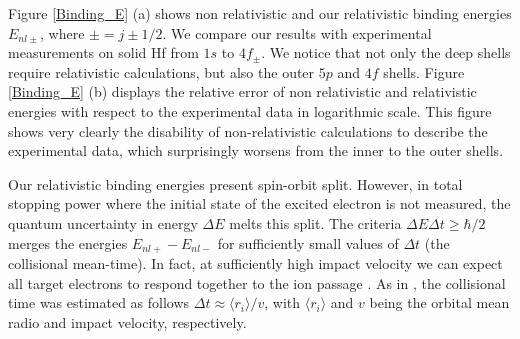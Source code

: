 \documentclass[aps,prb,reprint,groupedaddress]{revtex4-1}
\begin{document}
Figure \ref{Binding_E} (a) shows non relativistic and our relativistic binding energies $E_{nl\pm}$, where $\pm=j\pm1/2$.
We compare our results with experimental measurements on solid Hf \cite{williams1995} from $1s$ to $4f_{\pm}$. We notice that not only the deep shells require relativistic calculations, but also the outer $5p$ and $4f$ shells. Figure \ref{Binding_E} (b) displays the relative error of non relativistic and relativistic energies with respect to the experimental data in logarithmic scale. This figure shows very clearly the disability of non-relativistic calculations to describe the experimental data, which surprisingly worsens from the inner to the outer shells. 


Our relativistic binding energies present spin-orbit split. However, in total stopping power where the initial state of the excited electron is not measured, the quantum uncertainty in energy $\Delta E$ melts this split. The criteria $\Delta E\Delta t \geq \hbar /2$ merges the energies  $E_{nl+} - E_{nl-}$ for sufficiently small values of $\Delta t$ (the collisional mean-time). In fact, at sufficiently high impact velocity we can expect all target electrons to respond together to the ion passage \cite{lindhard53,chu72}. As in \cite{mon09}, the collisional time was estimated as follows $\Delta t \approx \langle r_i\rangle/v$, with $\langle r_i\rangle$ and $v$ being the orbital mean radio and impact velocity, respectively. 
\end{document}
